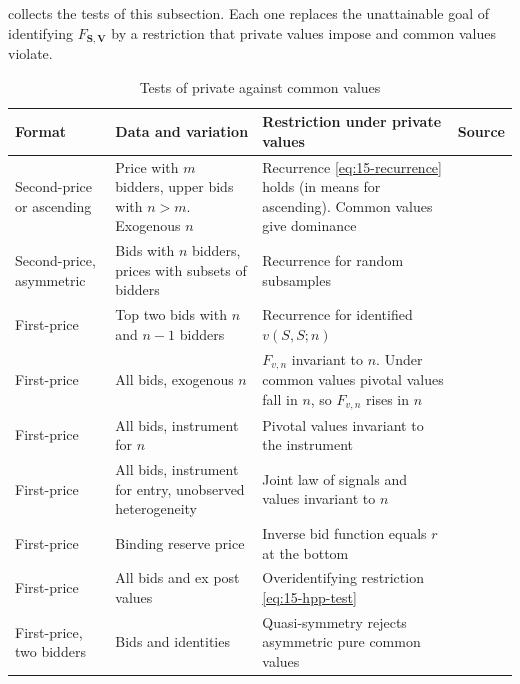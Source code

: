  collects the tests of this subsection. Each one replaces the unattainable goal of
identifying $F_{\bm S,\bm V}$ by a restriction that private values impose and common values violate.

\begin{table}[htbp]
\centering
\caption{Tests of private against common values}\label{tab:15-cv-tests}
\small
\begin{tabularx}{\textwidth}{@{}>{\raggedright\arraybackslash}p{2.6cm}>{\raggedright\arraybackslash}X>{\raggedright\arraybackslash}X>{\raggedright\arraybackslash}p{2.5cm}@{}}
\toprule
Format & Data and variation & Restriction under private values & Source \\
\midrule
Second-price or ascending & Price with $m$ bidders, upper bids with $n>m$. Exogenous $n$ & Recurrence
\eqref{eq:15-recurrence} holds (in means for ascending). Common values give dominance & \citet[Thm.~9]{AtheyHaile2002} \\
Second-price, asymmetric & Bids with $n$ bidders, prices with subsets of bidders & Recurrence for random
subsamples & \citet[Thm.~10]{AtheyHaile2002} \\
First-price & Top two bids with $n$ and $n-1$ bidders & Recurrence for identified $v(S,S;n)$ & \citet[Thm.~11]{AtheyHaile2002} \\
First-price & All bids, exogenous $n$ & $F_{v,n}$ invariant to $n$. Under common values pivotal values fall in $n$, so $F_{v,n}$ rises in $n$ &
\citet{HaileHongShum2003} \\
First-price & All bids, instrument for $n$ & Pivotal values invariant to the instrument & \citet{HaileHongShum2003} \\
First-price & All bids, instrument for entry, unobserved heterogeneity & Joint law of signals and values invariant to $n$ & \citet{CompianiHaileSantAnna2020} \\
First-price & Binding reserve price & Inverse bid function equals $r$ at the bottom & \citet{HendricksPinksePorter2003} \\
First-price & All bids and ex post values & Overidentifying restriction \eqref{eq:15-hpp-test} & \citet{HendricksPinksePorter2003} \\
First-price, two bidders & Bids and identities & Quasi-symmetry rejects asymmetric pure common values & \citet{CampoPerrigneVuong2003} \\
\bottomrule
\end{tabularx}
\end{table}

